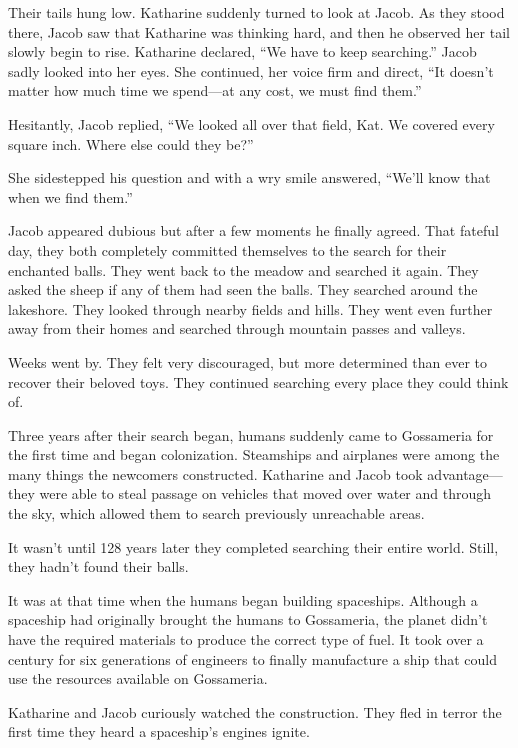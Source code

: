 Their tails hung low. Katharine suddenly turned to look at Jacob. As they stood there, Jacob saw that Katharine was thinking hard, and then he observed her tail slowly begin to rise. Katharine declared, “We have to keep searching.” Jacob sadly looked into her eyes. She continued, her voice firm and direct, “It doesn't matter how much time we spend—at any cost, we must find them.”

Hesitantly, Jacob replied, “We looked all over that field, Kat. We covered every square inch. Where else could they be?”

She sidestepped his question and with a wry smile answered, “We'll know that when we find them.”

Jacob appeared dubious but after a few moments he finally agreed. That fateful day, they both completely committed themselves to the search for their enchanted balls. They went back to the meadow and searched it again. They asked the sheep if any of them had seen the balls. They searched around the lakeshore. They looked through nearby fields and hills. They went even further away from their homes and searched through mountain passes and valleys.

Weeks went by. They felt very discouraged, but more determined than ever to recover their beloved toys. They continued searching every place they could think of.

\timesep


Three years after their search began, humans suddenly came to Gossameria for the first time and began colonization. Steamships and airplanes were among the many things the newcomers constructed. Katharine and Jacob took advantage—they were able to steal passage on vehicles that moved over water and through the sky, which allowed them to search previously unreachable areas.

It wasn't until 128 years later they completed searching their entire world. Still, they hadn't found their balls.

It was at that time when the humans began building spaceships. Although a spaceship had originally brought the humans to Gossameria, the planet didn't have the required materials to produce the correct type of fuel. It took over a century for six generations of engineers to finally manufacture a ship that could use the resources available on Gossameria.

Katharine and Jacob curiously watched the construction. They fled in terror the first time they heard a spaceship's engines ignite.

